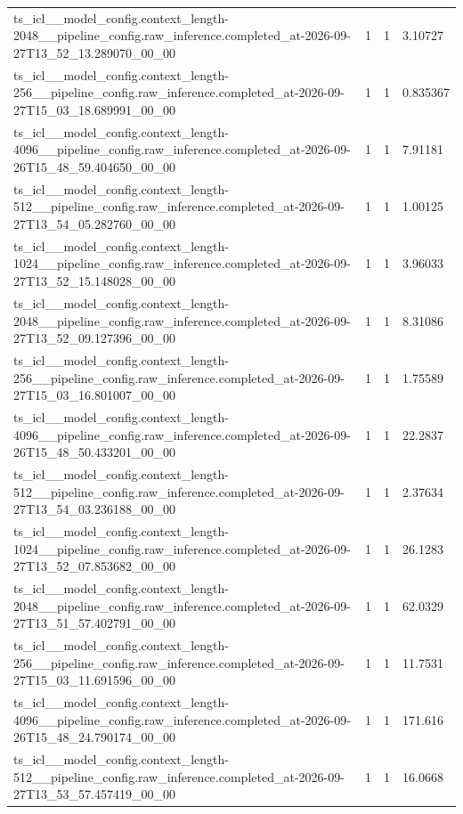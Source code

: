 \begin{tabular}{llll}
ts\_icl\_\_model\_config.context\_length-2048\_\_pipeline\_config.raw\_inference.completed\_at-2026-09-27T13\_52\_13.289070\_00\_00 & 1 & 1 & 3.10727 \\
ts\_icl\_\_model\_config.context\_length-256\_\_pipeline\_config.raw\_inference.completed\_at-2026-09-27T15\_03\_18.689991\_00\_00 & 1 & 1 & 0.835367 \\
ts\_icl\_\_model\_config.context\_length-4096\_\_pipeline\_config.raw\_inference.completed\_at-2026-09-26T15\_48\_59.404650\_00\_00 & 1 & 1 & 7.91181 \\
ts\_icl\_\_model\_config.context\_length-512\_\_pipeline\_config.raw\_inference.completed\_at-2026-09-27T13\_54\_05.282760\_00\_00 & 1 & 1 & 1.00125 \\
ts\_icl\_\_model\_config.context\_length-1024\_\_pipeline\_config.raw\_inference.completed\_at-2026-09-27T13\_52\_15.148028\_00\_00 & 1 & 1 & 3.96033 \\
ts\_icl\_\_model\_config.context\_length-2048\_\_pipeline\_config.raw\_inference.completed\_at-2026-09-27T13\_52\_09.127396\_00\_00 & 1 & 1 & 8.31086 \\
ts\_icl\_\_model\_config.context\_length-256\_\_pipeline\_config.raw\_inference.completed\_at-2026-09-27T15\_03\_16.801007\_00\_00 & 1 & 1 & 1.75589 \\
ts\_icl\_\_model\_config.context\_length-4096\_\_pipeline\_config.raw\_inference.completed\_at-2026-09-26T15\_48\_50.433201\_00\_00 & 1 & 1 & 22.2837 \\
ts\_icl\_\_model\_config.context\_length-512\_\_pipeline\_config.raw\_inference.completed\_at-2026-09-27T13\_54\_03.236188\_00\_00 & 1 & 1 & 2.37634 \\
ts\_icl\_\_model\_config.context\_length-1024\_\_pipeline\_config.raw\_inference.completed\_at-2026-09-27T13\_52\_07.853682\_00\_00 & 1 & 1 & 26.1283 \\
ts\_icl\_\_model\_config.context\_length-2048\_\_pipeline\_config.raw\_inference.completed\_at-2026-09-27T13\_51\_57.402791\_00\_00 & 1 & 1 & 62.0329 \\
ts\_icl\_\_model\_config.context\_length-256\_\_pipeline\_config.raw\_inference.completed\_at-2026-09-27T15\_03\_11.691596\_00\_00 & 1 & 1 & 11.7531 \\
ts\_icl\_\_model\_config.context\_length-4096\_\_pipeline\_config.raw\_inference.completed\_at-2026-09-26T15\_48\_24.790174\_00\_00 & 1 & 1 & 171.616 \\
ts\_icl\_\_model\_config.context\_length-512\_\_pipeline\_config.raw\_inference.completed\_at-2026-09-27T13\_53\_57.457419\_00\_00 & 1 & 1 & 16.0668 \\

\end{tabular}
